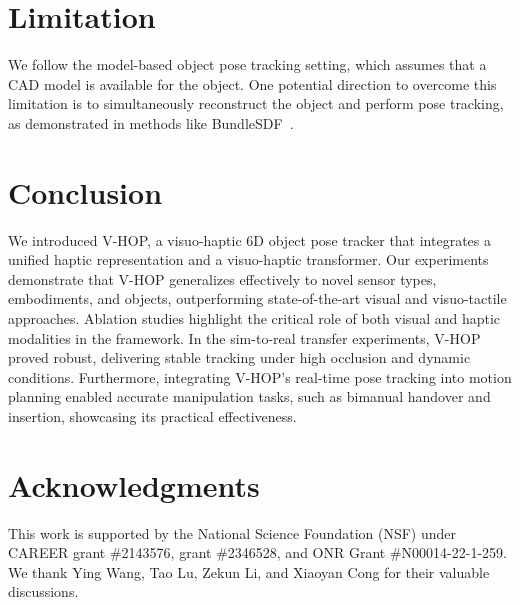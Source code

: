 \documentclass[11pt, a4paper, logo, twocolumn]{brown}
\begin{document}
\section{Limitation}
We follow the model-based object pose tracking setting, which assumes that a CAD model is available for the object.
One potential direction to overcome this limitation is to simultaneously reconstruct the object and perform pose tracking, as demonstrated in methods like BundleSDF~\cite{wen_bundlesdf_2023}.

\section{Conclusion}
We introduced V-HOP, a visuo-haptic 6D object pose tracker that integrates a unified haptic representation and a visuo-haptic transformer. 
Our experiments demonstrate that V-HOP generalizes effectively to novel sensor types, embodiments, and objects, outperforming state-of-the-art visual and visuo-tactile approaches. 
Ablation studies highlight the critical role of both visual and haptic modalities in the framework.
In the sim-to-real transfer experiments, V-HOP proved robust, delivering stable tracking under high occlusion and dynamic conditions. 
Furthermore, integrating V-HOP's real-time pose tracking into motion planning enabled accurate manipulation tasks, such as bimanual handover and insertion, showcasing its practical effectiveness.

\section*{Acknowledgments}
This work is supported by the National Science Foundation (NSF) under CAREER grant \#2143576, grant \#2346528, and ONR Grant \#N00014-22-1-259.
We thank Ying Wang, Tao Lu, Zekun Li, and Xiaoyan Cong for their valuable discussions.




\newpage

\end{document}
